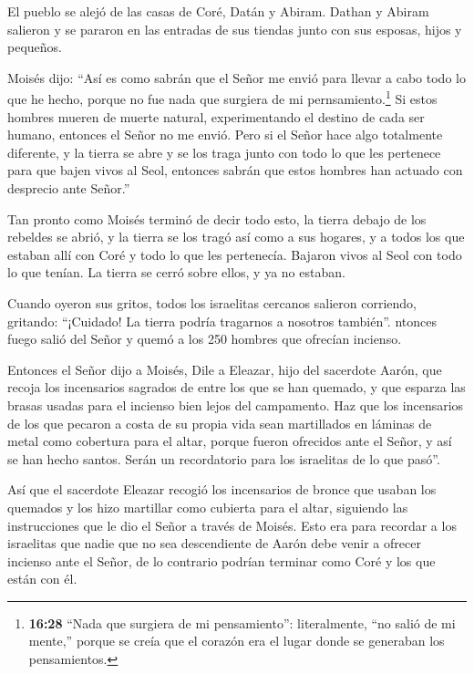  El pueblo se alejó de las casas de Coré, Datán y Abiram.
Dathan y Abiram salieron y se pararon en las entradas de sus tiendas
junto con sus esposas, hijos y pequeños.

 Moisés dijo: ``Así es como sabrán que el Señor me envió
para llevar a cabo todo lo que he hecho, porque no fue nada que surgiera
de mi pernsamiento.\footnote{\textbf{16:28} ``Nada que surgiera de mi
  pensamiento'': literalmente, ``no salió de mi mente,'' porque se creía
  que el corazón era el lugar donde se generaban los pensamientos.}
 Si estos hombres mueren de muerte natural, experimentando
el destino de cada ser humano, entonces el Señor no me envió.
 Pero si el Señor hace algo totalmente diferente, y la
tierra se abre y se los traga junto con todo lo que les pertenece para
que bajen vivos al Seol, entonces sabrán que estos hombres han actuado
con desprecio ante Señor.''

 Tan pronto como Moisés terminó de decir todo esto, la
tierra debajo de los rebeldes se abrió,  y la tierra se los
tragó así como a sus hogares, y a todos los que estaban allí con Coré y
todo lo que les pertenecía.  Bajaron vivos al Seol con todo
lo que tenían. La tierra se cerró sobre ellos, y ya no estaban.

 Cuando oyeron sus gritos, todos los israelitas cercanos
salieron corriendo, gritando: ``¡Cuidado! La tierra podría tragarnos a
nosotros también''.  ntonces fuego salió del Señor y quemó
a los 250 hombres que ofrecían incienso.

 Entonces el Señor dijo a Moisés,  Dile a
Eleazar, hijo del sacerdote Aarón, que recoja los incensarios sagrados
de entre los que se han quemado, y que esparza las brasas usadas para el
incienso bien lejos del campamento.  Haz que los
incensarios de los que pecaron a costa de su propia vida sean
martillados en láminas de metal como cobertura para el altar, porque
fueron ofrecidos ante el Señor, y así se han hecho santos. Serán un
recordatorio para los israelitas de lo que pasó''.

 Así que el sacerdote Eleazar recogió los incensarios de
bronce que usaban los quemados y los hizo martillar como cubierta para
el altar,  siguiendo las instrucciones que le dio el Señor
a través de Moisés. Esto era para recordar a los israelitas que nadie
que no sea descendiente de Aarón debe venir a ofrecer incienso ante el
Señor, de lo contrario podrían terminar como Coré y los que están con
él.

